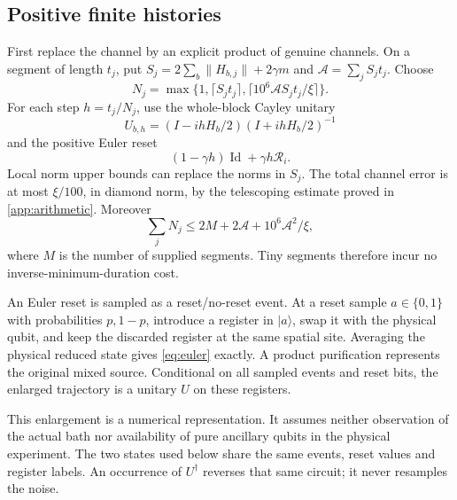\documentclass[11pt,reqno]{amsart}
\numberwithin{equation}{section}
\theoremstyle{definition}
\theoremstyle{remark}
\newcommand{\Id}{\operatorname{Id}}
\newcommand{\nn}[1]{\lVert#1\rVert}
\newcommand{\ket}[1]{\lvert#1\rangle}
\newcommand{\reset}{\mathcal R}
\begin{document}
\subsection{Positive finite histories}
First replace the channel by an explicit product of genuine channels. On a segment of length $t_j$, put $S_j=2\sum_b\nn{H_{b,j}}+2\gamma m$ and $\mathcal A=\sum_jS_jt_j$. Choose
\begin{equation}\label{eq:steps}
 N_j=\max\{1,\lceil S_jt_j\rceil,
 \lceil 10^6\mathcal A S_jt_j/\xi\rceil\}.
\end{equation}
For each step $h=t_j/N_j$, use the whole-block Cayley unitary
\begin{equation}\label{eq:cayley}
 U_{b,h}=(I-ihH_b/2)(I+ihH_b/2)^{-1}
\end{equation}
and the positive Euler reset
\begin{equation}\label{eq:euler}
 (1-\gamma h)\Id+\gamma h\reset_i.
\end{equation}
Local norm upper bounds can replace the norms in $S_j$. The total channel error is at most $\xi/100$, in diamond norm, by the telescoping estimate proved in \cref{app:arithmetic}. Moreover
\begin{equation}\label{eq:totalsteps}
 \sum_jN_j\leq 2M+2\mathcal A+10^6\mathcal A^2/\xi,
\end{equation}
where $M$ is the number of supplied segments. Tiny segments therefore incur no inverse-minimum-duration cost.

An Euler reset is sampled as a reset/no-reset event. At a reset sample $a\in\{0,1\}$ with probabilities $p,1-p$, introduce a register in $\ket a$, swap it with the physical qubit, and keep the discarded register at the same spatial site. Averaging the physical reduced state gives \eqref{eq:euler} exactly. A product purification represents the original mixed source. Conditional on all sampled events and reset bits, the enlarged trajectory is a unitary $U$ on these registers.

This enlargement is a numerical representation. It assumes neither observation of the actual bath nor availability of pure ancillary qubits in the physical experiment. The two states used below share the same events, reset values and register labels. An occurrence of $U^\dagger$ reverses that same circuit; it never resamples the noise.
\end{document}
